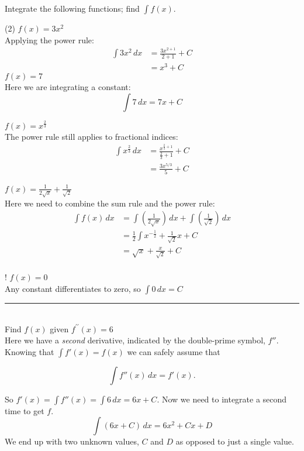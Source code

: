 \example Integrate the following functions; find $\displaystyle\int f(x)$.
\begin{tasks}(2)
	\task $f(x) =3x^{2}$ \medskip\\
	\solution Applying the power rule:\\
\begin{align*}\int 3x^{2}\,dx&=\frac{3x^{2+1}}{2+1}+C\\
	&=x^3+C\end{align*}
\task $f (x) =7$ \medskip \\
\solution Here we are integrating a constant:\\
\[\int 7\,dx=7x+C\]

\task $f(x) =x^{\frac{2}{3}}$ \medskip\\
\solution The power rule still applies to fractional indices:\\
\begin{align*}\int x^{\frac{2}{3}}\,dx&=\frac{x^{\frac{2}{3}+1}}{\frac{2}{3}+1}+C\\
&=\frac{3 x^{5/3}}{5}+C \end{align*}

\task $f (x) =\frac{1}{2 \sqrt{x}} +\frac{1}{\sqrt{2}}$ \medskip\\
\solution Here we need to combine the sum rule and the power rule:\\
\begin{align*}
\int f(x)\,dx &= \int(\frac{1}{2 \sqrt{x}}) \,dx+\int(\frac{1}{\sqrt{2}}) \,dx\\
&=\frac{1}{2}\int x^{-\frac{1}{2}}+\frac{1}{\sqrt{2}}x+C\\
&=\sqrt{x}+\frac{x}{\sqrt{2}}+C\\
\end{align*}

\task! $f(x)=0$\medskip\\
\solution Any constant differentiates to zero, so $\int 0\, dx=C$
\end{tasks}

\rule{6.8cm}{0.5pt}\\
\example Find $f (x)$ given $f^{ \prime  \prime } (x) =6$\medskip\\
\solution Here we have a \textit{second} derivative, indicated by the double-prime symbol, $f''$. Knowing that $\int f'(x)=f(x)$ we can safely assume that 
\begin{tcolorbox}
	\[\int f''(x) \,dx = f'(x).\]
\end{tcolorbox}
So $f'(x)=\int f''(x) = \int 6 \,dx = 6x+C$. Now we need to integrate a second time to get $f$.
\[\int (6x+C)\,dx=6x^2+Cx+D\]
We end up with two unknown values, $C$ and $D$ as opposed to just a single value.


